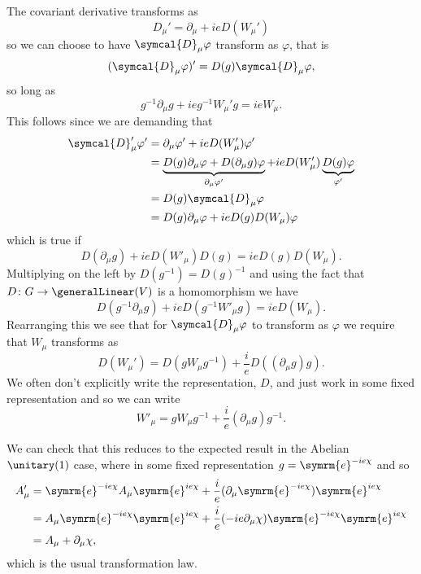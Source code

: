 \documentclass[fleqn]{NotesClass}
\newcommand{\e}{\symrm{e}}
\newcommand{\covariantDerivative}{\symcal{D}}
\begin{document}
    The covariant derivative transforms as
    \begin{equation}
        D_\mu' = \partial_\mu + ieD(W_\mu')
    \end{equation}
    so we can choose to have \(\covariantDerivative_\mu \varphi\) transform as \(\varphi\), that is
    \begin{equation}
        (\covariantDerivative_\mu \varphi)' = D(g)\covariantDerivative_\mu \varphi,
    \end{equation}
    so long as
    \begin{equation}
        g^{-1}\partial_\mu g + ieg^{-1}W_\mu'g = ieW_\mu.
    \end{equation}
    This follows since we are demanding that
    \begin{align}
        \covariantDerivative_\mu'\varphi' &= \partial_\mu\varphi' + ieD(W_\mu')\varphi'\\
        &= \underbrace{D(g)\partial_\mu \varphi + D(\partial_\mu g)\varphi}_{\partial_\mu \varphi'} + ieD(W_\mu')\underbrace{D(g)\varphi}_{\varphi'}\\
        &= D(g)\covariantDerivative_\mu \varphi\\
        &= D(g)\partial_\mu \varphi + ieD(g)D(W_\mu)\varphi
    \end{align}
    which is true if
    \begin{equation}
        D(\partial_\mu g) + ieD(W'_\mu)D(g) = ieD(g)D(W_\mu).
    \end{equation}
    Multiplying on the left by \(D(g^{-1}) = D(g)^{-1}\) and using the fact that \(D \colon G \to \generalLinear(V)\) is a homomorphism we have
    \begin{equation}
        D(g^{-1}\partial_\mu g) + ieD(g^{-1}W'_\mu g) = ieD(W_\mu).
    \end{equation}
    Rearranging this we see that for \(\covariantDerivative_\mu \varphi\) to transform as \(\varphi\) we require that \(W_\mu\) transforms as
    \begin{equation}
        D(W_\mu') = D(gW_\mu g^{-1}) + \frac{i}{e}D((\partial_\mu g)g).
    \end{equation}
    We often don't explicitly write the representation, \(D\), and just work in some fixed representation and so we can write
    \begin{equation}
        W'_\mu = gW_\mu g^{-1} + \frac{i}{e}(\partial_\mu g)g^{-1}.
    \end{equation}
    
    We can check that this reduces to the expected result in the Abelian \(\unitary(1)\) case, where in some fixed representation \(g = \e^{-ie\chi}\) and so
    \begin{align}
        A'_\mu &= \e^{-ie\chi} A_\mu \e^{ie\chi} + \frac{i}{e}(\partial_\mu \e^{-ie\chi})\e^{ie\chi}\\
        &= A_\mu \e^{-ie\chi}\e^{ie\chi} + \frac{i}{e}(-ie\partial_\mu \chi)\e^{-ie\chi}\e^{ie\chi}\\
        &= A_\mu + \partial_\mu \chi,
    \end{align}
    which is the usual transformation law.
    
\end{document}
